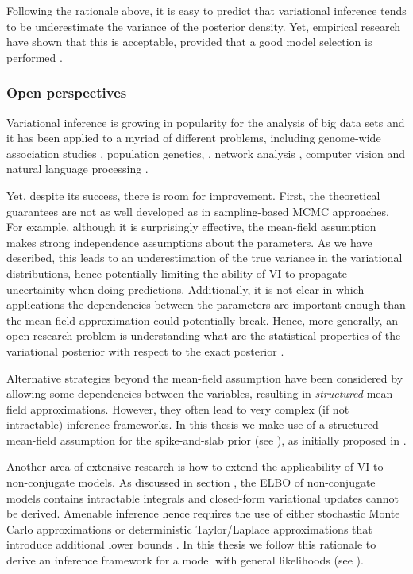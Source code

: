 Following the rationale above, it is easy to predict that variational inference tends to be underestimate the variance of the posterior density. Yet, empirical research have shown that this is acceptable, provided that a good model selection is performed \cite{Blei2006}.


\subsubsection{Open perspectives}  \label{section:bayes_open_perspectives}
Variational inference is growing in popularity for the analysis of big data sets and it has been applied to a myriad of different problems, including genome-wide association studies \cite{Carbonetto2012}, population genetics, \cite{Raj2014}, network analysis \cite{Sanguinetti2006}, computer vision \cite{Likas2004} and natural language processing \cite{Blei2003}.

Yet, despite its success, there is room for improvement. First, the theoretical guarantees are not as well developed as in sampling-based MCMC approaches\cite{Blei2016,Zhang2017,Nakajima2007}. For example, although it is surprisingly effective, the mean-field assumption makes strong independence assumptions about the parameters. As we have described, this leads to an underestimation of the true variance in the variational distributions, hence potentially limiting the ability of VI to propagate uncertainity when doing predictions. Additionally, it is not clear in which applications the dependencies between the parameters are important enough than the mean-field approximation could potentially break. Hence, more generally, an open research problem is understanding what are the statistical properties of the variational posterior with respect to the exact posterior \cite{Blei2016,Zhang2017}.

Alternative strategies beyond the mean-field assumption have been considered by allowing some dependencies between the variables, resulting in \textit{structured} mean-field approximations\cite{Barber1998,Lawrence1996,Hoffman2014}. However, they often lead to very complex (if not intractable) inference frameworks. In this thesis we make use of a structured mean-field assumption for the spike-and-slab prior (see ), as initially proposed in \cite{Titsias2011}.

Another area of extensive research is how to extend the applicability of VI to non-conjugate models. As discussed in section , the ELBO of non-conjugate models contains intractable integrals and closed-form variational updates cannot be derived. Amenable inference hence requires the use of either stochastic Monte Carlo approximations \cite{XX} or deterministic Taylor/Laplace approximations that introduce additional lower bounds \cite{Zhang2017,Seeger2012,Khan2017}. In this thesis we follow this rationale to derive an inference framework for a model with general likelihoods (see ).

